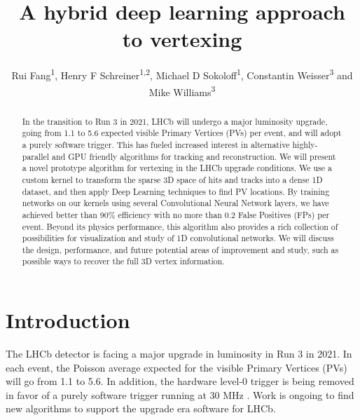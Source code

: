 \documentclass[a4paper]{jpconf}
\begin{document}
\title{A hybrid deep learning approach to vertexing}

\author{
   Rui Fang\textsuperscript{1},
   Henry F Schreiner\textsuperscript{1,2},
   Michael D Sokoloff\textsuperscript{1},
   Constantin Weisser\textsuperscript{3} and
   Mike Williams\textsuperscript{3}
}

\address{
    \textsuperscript{1} University of Cincinnati, Cincinnati, OH, United States
}
\address{
    \textsuperscript{2} Princeton University, Princeton, NJ, United States
}
\address{
    \textsuperscript{3} Massachusetts Institute of Technology, Cambridge, MA, United States
}


\begin{abstract}
In the transition to Run 3 in 2021, LHCb will undergo a major luminosity upgrade, going from 1.1 to 5.6 expected visible Primary Vertices (PVs) per event, and will adopt a purely software trigger. This has fueled increased interest in alternative highly-parallel and GPU friendly algorithms for tracking and reconstruction. We will present a novel prototype algorithm for vertexing in the LHCb upgrade conditions.
We use a custom kernel to transform the sparse 3D space of hits and tracks into a dense 1D dataset, and then apply Deep Learning techniques to find PV locations. By training networks on our kernels using several Convolutional Neural Network layers, we have achieved better than 90\% efficiency with no more than 0.2 False Positives (FPs) per event. Beyond its physics performance, this algorithm also provides a rich collection of possibilities for visualization and study of 1D convolutional networks. We will discuss the design, performance, and future potential areas of improvement and study, such as possible ways to recover the full 3D vertex information.
\end{abstract}


\section{Introduction}


The LHCb detector is facing a major upgrade in luminosity in Run 3 in 2021. In each event, the Poisson average expected for the visible Primary Vertices (PVs) will go from 1.1 to 5.6. In addition, the hardware level-0 trigger is being removed in favor of a purely software trigger running at 30 MHz \cite{CERN-LHCC-2014-016}. Work is ongoing to find new algorithms to support the upgrade era software for LHCb.
\end{document}
